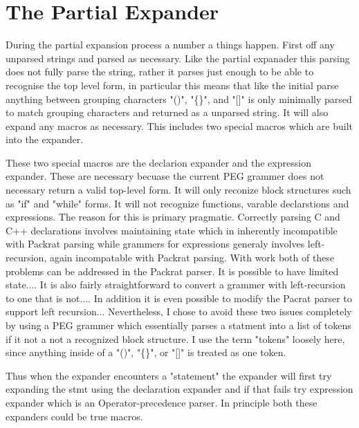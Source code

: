 \documentclass[12pt,english,letterpaper]{article}
\begin{document}
\section{The Partial Expander}

During the partial expansion process a number a things happen.  First
off any unparsed strings and parsed as necessary.  Like the partial
expanader this parsing does not fully parse the string, rather it
parses just enough to be able to recognise the top level form, in
particular this means that like the initial parse anything between
grouping characters "()", "\{\}", and "[]" is only minimally parsed to
match grouping characters and returned as a unparsed string.  It will
also expand any macros as necessary.  This includes two special macros
which are built into the expander.

These two special macros are the declarion expander and the expression
expander.  These are necessary becuase the current PEG grammer does
not necessary return a valid top-level form.  It will only reconize
block structures such as "if" and "while" forms.  It will not
recognize functions, varable declarstions and expressions.  The reason
for this is primary pragmatic.  Correctly parsing C and C++
declarations involves maintaining state which in inherently
incompatible with Packrat parsing while grammers for expressions
generaly involves left-recursion, again incompatable with Packrat
parsing.  With work both of these problems can be addressed in the
Packrat parser.  It is possible to have limited state....  It is also
fairly straightforward to convert a grammer with left-recursion to one
that is not....  In addition it is even possible to modify the Pacrat
parser to support left recursion...  Nevertheless, I chose to avoid
these two issues completely by using a PEG grammer which essentially
parses a statment into a list of tokens if it not a not a recognized
block structure.  I use the term "tokens" loosely here, since anything
inside of a "()", "\{\}", or "[]" is treated as one token.

Thus when the expander encounters a "statement" the expander will
first try expanding the stmt using the declaration expander and if
that fails try expression expander which is an Operator-precedence
parser.  In principle both these expanders could be true macros.

\end{document}
